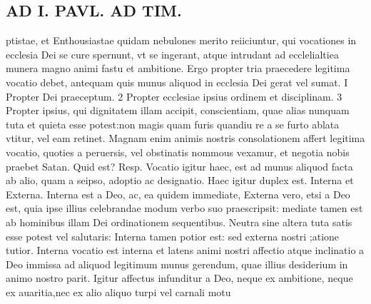 \documentclass{article}
\begin{document}
\begin{pages}
\section*{AD I. PAVL. AD TIM. }
\marginpar{[ p.STF. ]}\pstart ptistae, et Enthousiastae quidam nebulones merito reiiciuntur, qui vocationes in ecclesia Dei se cure spernunt, vt se ingerant, atque intrudant ad ecclelialtiea munera magno animi fastu et ambitione.  \pend\pstart Ergo propter tria praecedere legitima vocatio debet, antequam quis munus aliquod in ecclesia Dei gerat vel sumat. I Propter Dei praeceptum. 2 Propter ecclesiae ipsius ordinem et disciplinam. 3 Propter ipsius, qui dignitatem illam accipit, conscientiam, quae alias nunquam tuta et quieta esse potest:non magis quam furis quandiu re a se furto ablata vtitur, vel eam retinet. Magnam enim animis nostris consolationem affert legitima vocatio, quoties a peruersis, vel obstinatis nommous vexamur, et negotia nobis praebet Satan. Quid est? Resp.  \pend\pstart Vocatio igitur haec, est ad munus aliquod facta ab alio, quam a seipso, adoptio ac designatio. Haec igitur duplex est. Interna et Externa.  \pend\pstart Interna est a Deo, ac, ea quidem immediate, Externa vero, etsi a Deo est, quia ipse illius celebrandae modum verbo suo praescripsit: mediate tamen est ab hominibus illam Dei ordinationem sequentibus. Neutra sine altera tuta satis esse potest vel salutaris: Interna tamen potior est: sed externa nostri ;atione tutior.  \pend\pstart Interna vocatio est interna et latens animi nostri affectio atque inclinatio a Deo immissa ad aliquod legitimum munus gerendum, quae illius desiderium in animo nostro parit. Igitur affectus infunditur a Deo, neque ex ambitione, neque ex auaritia,nec ex alio aliquo turpi vel carnali motu  \pend

\end{pages}
\end{document}
